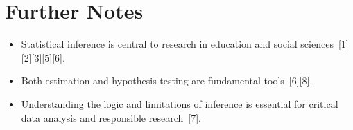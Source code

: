 \documentclass[11pt]{article}
\begin{document}
\section{Further Notes}

\begin{itemize}
    \item Statistical inference is central to research in education and social sciences\ [1][2][3][5][6].
    \item Both estimation and hypothesis testing are fundamental tools\ [6][8].
    \item Understanding the logic and limitations of inference is essential for critical data analysis and responsible research\ [7].
\end{itemize}
\end{document}
